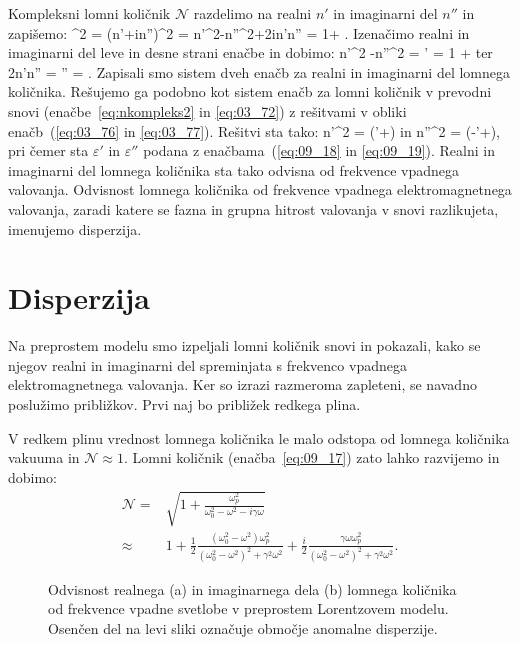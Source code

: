 Kompleksni lomni količnik $\mathcal{N}$ razdelimo na realni $n'$ in imaginarni del $n''$ in 
zapišemo:
\beq
{}^2 = (n'+in'')^2 = n'^2-n''^2+2in'n'' =  1+ .
\label{eq:09_17}
\eeq
Izenačimo realni in imaginarni del leve in desne strani enačbe in dobimo:
\beq
n'^2 -n''^2 = \varepsilon' = 1 + 
\label{eq:09_18}
\eeq
ter 
\beq
2n'n'' = \varepsilon'' = .
\label{eq:09_19}
\eeq
Zapisali smo sistem dveh enačb za realni in imaginarni del lomnega količnika. Rešujemo ga podobno kot
sistem enačb za lomni količnik v prevodni snovi (enačbe~\ref{eq:nkompleks2} in \ref{eq:03_72})
z rešitvami v obliki enačb~(\ref{eq:03_76} in \ref{eq:03_77}). Rešitvi sta tako:
\beq
n'^2 = \left(\varepsilon'+\right)
\label{eq:09_20}
\eeq
in
\beq
n''^2 = \left(-\varepsilon'+\right)\!,
\label{eq:09_21}
\eeq
pri čemer sta $\varepsilon'$ in $\varepsilon''$ podana z enačbama~(\ref{eq:09_18} in \ref{eq:09_19}).
Realni in imaginarni del lomnega količnika sta tako odvisna od frekvence vpadnega valovanja. 
Odvisnost lomnega količnika od frekvence vpadnega elektromagnetnega valovanja, zaradi katere
se fazna in grupna hitrost valovanja v snovi razlikujeta, imenujemo disperzija.

\section{Disperzija}
Na preprostem modelu smo izpeljali lomni količnik snovi in pokazali,
kako se njegov realni in imaginarni del
spreminjata s frekvenco vpadnega elektromagnetnega valovanja. Ker so izrazi
razmeroma zapleteni, se navadno poslužimo približkov. Prvi naj 
bo približek redkega plina. 

V redkem plinu vrednost lomnega količnika le malo odstopa od lomnega količnika vakuuma 
in $\mathcal{N} \approx 1$. Lomni količnik (enačba~\ref{eq:09_17}) zato lahko razvijemo in dobimo:
\begin{align}
\mathcal{N} =& \sqrt{1+ \frac{\omega_p^2}{\omega_0^2 - \omega^2 - i\gamma \omega}} \\
\approx& 1 + \frac{1}{2}\frac{\left(\omega_0^2 - \omega^2\right)\omega_p^2}{\left(\omega_0^2 - 
\omega^2\right)^2 + \gamma^2 \omega^2} + \frac{i}{2}\frac{\gamma \omega \omega_p^2}{\left(\omega_0^2 - 
\omega^2\right)^2 + \gamma^2 \omega^2}.
\label{eq:09_22}
\end{align}
\begin{figure}[h!]
\centering
\def\svgwidth{140truemm} 

\caption{Odvisnost realnega (a) in imaginarnega dela (b) lomnega količnika od 
frekvence vpadne svetlobe v preprostem Lorentzovem modelu. Osenčen del na levi 
sliki označuje območje anomalne disperzije.}
\label{fig:09_nkompleks}
\end{figure}

